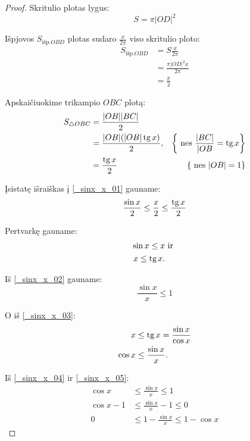 \begin{exmp}
\begin{proof}
    Skritulio plotas lygus:
    \begin{equation*}
      S = \pi |OD|^2
    \end{equation*}

    Išpjovos $S_{\text{išp.}OBD}$ plotas sudaro $\frac{x}{2 \pi}$ viso 
    skritulio ploto:
    \begin{align*}
      S_{\text{išp.}OBD} &= S \frac{x}{2 \pi} \\
      &= \frac{\pi |OD|^2 x}{2 \pi} \\
      &= \frac{x}{2}
    \end{align*}

    Apskaičiuokime trikampio $OBC$ plotą:
    \begin{align*}
      S_{\triangle OBC} &= \frac{ |OB| |BC| }{2} \\
      &= \frac{ |OB| (|OB| \mathop{\text{tg}} x)}{2}, 
        &\left\{ \text{ nes } \frac{|BC|}{|OB} = \mathop{\text{tg}} x \right\} \\
      &= \frac{\mathop{\text{tg}} x}{2} &\left\{ \text{ nes } |OB| = 1 \right\}
    \end{align*}

    Įsistatę išraiškas į \ref{_sinx_x_01} gauname:
    \begin{equation*}
      \frac{\sin x}{2} \leq \frac{x}{2} \leq \frac{\mathop{\text{tg}} x}{2}
    \end{equation*}

    Pertvarkę gauname:
    \begin{align}
      \sin x \leq x & \text{ ir } \label{_sinx_x_02} \\
      x \leq \mathop{\text{tg}} x. \label{_sinx_x_03}
    \end{align}

    Iš \ref{_sinx_x_02} gauname:
    \begin{equation}
      \frac{\sin x}{x} \leq 1 
      \label{_sinx_x_04}
    \end{equation}

    O iš \ref{_sinx_x_03}:
    \begin{align}
      x & \leq \mathop{\text{tg}} x = \frac{\sin x}{\cos x} \\
      \cos x &\leq \frac{\sin x}{x}.
      \label{_sinx_x_05}
    \end{align}

    Iš \ref{_sinx_x_04} ir \ref{_sinx_x_05}:
    \begin{align}
      \cos x &\leq \frac{\sin x}{x} \leq 1 \\
      \cos x - 1 &\leq \frac{\sin x}{x} - 1 \leq 0 \\
      0 &\leq 1 - \frac{\sin x}{x} \leq 1 - \cos x
    \end{align}


\end{proof}
\end{exmp}
